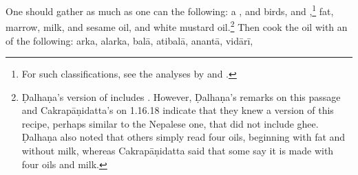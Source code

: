 \begin{translation}
One should gather as much as one can the following: a , %
 and  birds, and
,\footnote{For such
    classifications, see the analyses by \citet{zimm-1999} and \citet{smit-1994}.}
    fat, marrow, milk, and sesame oil, and white mustard oil.\footnote{Ḍalhaṇa's
        version of  includes . However, 
        Ḍalhaṇa's
        remarks on this passage and Cakrapāṇidatta's on 1.16.18 \citep[130]{acar-1939}
        indicate that they knew a version of this recipe, perhaps similar to the Nepalese
        one, that did not include ghee. Ḍalhaṇa also noted that others simply read four
        oils, beginning with fat and without milk, whereas Cakrapāṇidatta said that some
        say it is made with four oils and milk.} Then cook the oil with an  of the
        following: \gls{arka}, %
        \gls{alarka}, %
        \gls{balā}, %
        \gls{atibalā}, %
        \gls{anantā}, %
        \gls{vidārī}, %

\end{translation}
